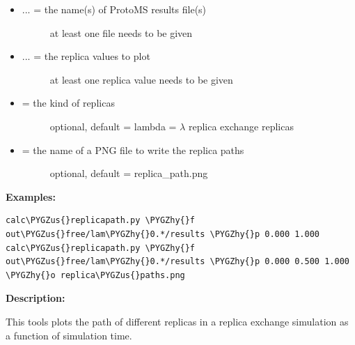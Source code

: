 \documentclass[letterpaper,10pt,english]{sphinxmanual}
\def\PYGZus{\char`\_}
\def\PYGZhy{\char`\-}
\begin{document}
\begin{itemize}
\item {} \begin{description}
\item[{ ... = the name(s) of ProtoMS results file(s)}] \leavevmode
at least one file needs to be given

\end{description}

\item {} \begin{description}
\item[{ ... = the replica values to plot}] \leavevmode
at least one replica value needs to be given

\end{description}

\item {} \begin{description}
\item[{ = the kind of replicas}] \leavevmode
optional, default = lambda
 = \(\lambda\) replica exchange replicas

\end{description}

\item {} \begin{description}
\item[{ = the name of a PNG file to write the replica paths}] \leavevmode
optional, default = replica\_path.png

\end{description}

\end{itemize}

\textbf{Examples:}

\begin{Verbatim}[frame=single,commandchars=\\\{\}]
calc\PYGZus{}replicapath.py \PYGZhy{}f out\PYGZus{}free/lam\PYGZhy{}0.*/results \PYGZhy{}p 0.000 1.000
calc\PYGZus{}replicapath.py \PYGZhy{}f out\PYGZus{}free/lam\PYGZhy{}0.*/results \PYGZhy{}p 0.000 0.500 1.000 \PYGZhy{}o replica\PYGZus{}paths.png
\end{Verbatim}

\textbf{Description:}

This tools plots the path of different replicas in a replica exchange simulation as a function of simulation time.
\end{document}
